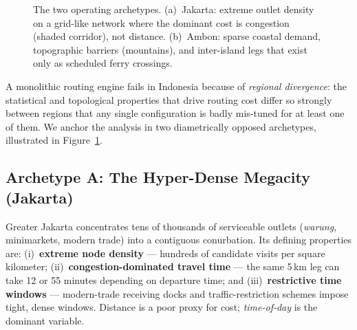 \documentclass[11pt,a4paper,twocolumn]{article}
\begin{document}
\begin{figure}[t]
  \caption{The two operating archetypes. (a)~Jakarta: extreme outlet
    density on a grid-like network where the dominant cost is congestion
    (shaded corridor), not distance. (b)~Ambon: sparse coastal demand,
    topographic barriers (mountains), and inter-island legs that exist only
    as scheduled ferry crossings.}
  \label{fig:archetypes}
\end{figure}

A monolithic routing engine fails in Indonesia because of \emph{regional
divergence}: the statistical and topological properties that drive routing
cost differ so strongly between regions that any single configuration is
badly mis-tuned for at least one of them. We anchor the analysis in two
diametrically opposed archetypes, illustrated in
Figure~\ref{fig:archetypes}.

\subsection{Archetype A: The Hyper-Dense Megacity (Jakarta)}

Greater Jakarta concentrates tens of thousands of serviceable outlets
(\emph{warung}, minimarkets, modern trade) into a contiguous conurbation.
Its defining properties are: (i)~\textbf{extreme node density} --- hundreds
of candidate visits per square kilometer; (ii)~\textbf{congestion-dominated
travel time} --- the same 5\,km leg can take 12 or 55 minutes depending on
departure time; and (iii)~\textbf{restrictive time windows} --- modern-trade
receiving docks and traffic-restriction schemes impose tight, dense
windows. Distance is a poor proxy for cost; \emph{time-of-day} is the
dominant variable.
\end{document}
